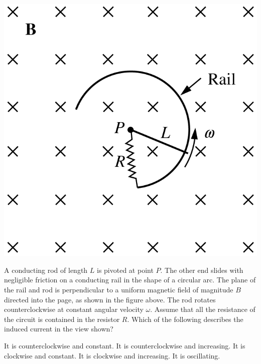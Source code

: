 \begin{center}
\includegraphics[scale=0.25]{images/img-007-007.png}
\end{center}

\begin{questions}\setcounter{question}{10}\question
A conducting rod of length $L$ is pivoted at point $P$. The other end slides with negligible friction on a conducting rail in the shape of a circular arc. The plane of the rail and rod is perpendicular to a uniform magnetic field of magnitude $B$ directed into the page, as shown in the figure above. The rod rotates counterclockwise at constant angular velocity $\omega$. Assume that all the resistance of the circuit is contained in the resistor $R$. Which of the following describes the induced current in the view shown?

\begin{choices}
\choice It is counterclockwise and constant.
\choice It is counterclockwise and increasing.
\choice It is clockwise and constant.
\choice It is clockwise and increasing.
\choice It is oscillating.
\end{choices}\end{questions}


